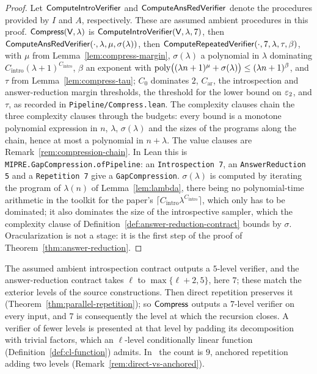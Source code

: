 \begin{proof}
\leanok
{}
Let $\mathsf{ComputeIntroVerifier}$ and $\mathsf{ComputeAnsRedVerifier}$ denote the procedures provided
by $I$ and $A$, respectively. These are assumed ambient procedures in this proof.
$\mathsf{Compress}(\mathsf{V}, \lambda)$ is $\mathsf{ComputeIntroVerifier}(\mathsf{V}, \lambda, 7)$, then
$\mathsf{ComputeAnsRedVerifier}(\cdot, \lambda, \mu, \sigma(\lambda))$, then
$\mathsf{ComputeRepeatedVerifier}(\cdot, 7, \lambda, \tau, \beta)$, with $\mu$ from
Lemma~\ref{lem:compress-margin}, $\sigma(\lambda)$ a polynomial in $\lambda$ dominating
$C_{\mathrm{intro}} (\lambda + 1)^{C_{\mathrm{intro}}}$, $\beta$ an exponent with
$\mathrm{poly}\bigl((\lambda n + 1)^\mu + \sigma(\lambda)\bigr) \leq (\lambda n + 1)^\beta$, and
$\tau$ from Lemma~\ref{lem:compress-tau}; $C_0$ dominates $2$, $C_{\mathrm{ar}}$,
the introspection and answer-reduction margin thresholds, the threshold for the lower
bound on $\varepsilon_2$, and $\tau$, as recorded in \texttt{Pipeline/Compress.lean}. The
complexity clauses chain the three complexity clauses through the budgets: every bound is a
monotone polynomial expression in $n$, $\lambda$, $\sigma(\lambda)$ and the sizes of the
programs along the chain, hence at most a polynomial in $n + \lambda$. The value clauses are
Remark~\ref{rem:compression-chain}. In Lean this is
\texttt{MIPRE.GapCompression.ofPipeline}: an \texttt{Introspection 7}, an
\texttt{AnswerReduction 5} and a \texttt{Repetition 7} give a \texttt{GapCompression}.
$\sigma(\lambda)$ is computed by iterating the program of $\lambda(n)$ of
Lemma~\ref{lem:lambda}, there being no polynomial-time arithmetic in the toolkit for the
paper's $\lceil C_{\mathrm{intro}} \lambda^{C_{\mathrm{intro}}} \rceil$, which only has to be
dominated; it also dominates the size of the introspective sampler, which the complexity
clause of Definition~\ref{def:answer-reduction-contract} bounds by $\sigma$. Oracularization is not a stage: it is the first step of the proof of
Theorem~\ref{thm:answer-reduction}.
\end{proof}

The assumed ambient introspection contract outputs a $5$-level verifier, and the
answer-reduction contract takes $\ell$ to $\max\{\ell+2,5\}$, here $7$; these match
the exterior levels of the source constructions. Then
direct repetition preserves it (Theorem~\ref{thm:parallel-repetition}); so $\mathsf{Compress}$
outputs a $7$-level verifier on every input, and $7$ is consequently the level at which
the recursion closes. A verifier of fewer levels is presented at that level by padding its
decomposition with trivial factors, which an $\ell$-level conditionally linear function
(Definition~\ref{def:cl-function}) admits. In~\cite{JNVWY20} the count is $9$, anchored
repetition adding two levels (Remark~\ref{rem:direct-vs-anchored}).

